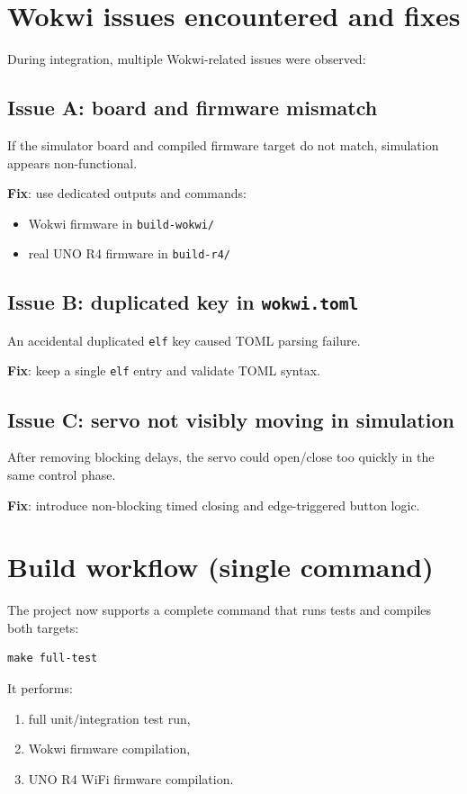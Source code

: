 \section{Wokwi issues encountered and fixes}
During integration, multiple Wokwi-related issues were observed:

\subsection{Issue A: board and firmware mismatch}
If the simulator board and compiled firmware target do not match, simulation appears non-functional.

\textbf{Fix}: use dedicated outputs and commands:
\begin{itemize}
  \item Wokwi firmware in \texttt{build-wokwi/}
  \item real UNO R4 firmware in \texttt{build-r4/}
\end{itemize}

\subsection{Issue B: duplicated key in \texttt{wokwi.toml}}
An accidental duplicated \texttt{elf} key caused TOML parsing failure.

\textbf{Fix}: keep a single \texttt{elf} entry and validate TOML syntax.

\subsection{Issue C: servo not visibly moving in simulation}
After removing blocking delays, the servo could open/close too quickly in the same control phase.

\textbf{Fix}: introduce non-blocking timed closing and edge-triggered button logic.

\section{Build workflow (single command)}
The project now supports a complete command that runs tests and compiles both targets:

\begin{lstlisting}[style=cppstyle]
make full-test
\end{lstlisting}

It performs:
\begin{enumerate}
  \item full unit/integration test run,
  \item Wokwi firmware compilation,
  \item UNO R4 WiFi firmware compilation.
\end{enumerate}

